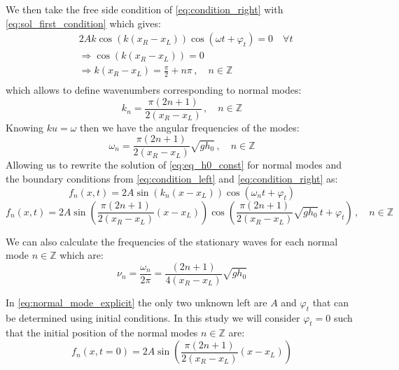 We then take the free side condition of \autoref{eq:condition_right} with \autoref{eq:sol_first_condition} which gives:
\[
    \begin{aligned}
        & 2A k \cos(k(x_R-x_L))\cos(\omega t + \varphi_t) = 0 \quad \forall t \\
        & \Rightarrow \cos(k(x_R-x_L)) = 0 \\
        & \Rightarrow k(x_R-x_L) = \frac{\pi}{2} + n\pi\,, \quad n \in \mathbb{Z} \\
    \end{aligned}
\]
which allows to define wavenumbers corresponding to normal modes:
\begin{equation}
    k_n = \frac{\pi(2n + 1)}{2(x_R-x_L)}\,, \quad n \in \mathbb{Z}
    \label{eq:wavenumber_mode}
\end{equation}
Knowing $ku = \omega$ then we have the angular frequencies of the modes:
\begin{equation}
    \omega_n = \frac{\pi(2n + 1)}{2(x_R-x_L)} \sqrt{gh_0}\,, \quad n \in \mathbb{Z}
    \label{eq:angular_mode}
\end{equation}
Allowing us to rewrite the solution of \autoref{eq:eq_h0_const} for normal modes and the boundary conditions from \autoref{eq:condition_left} and \autoref{eq:condition_right} as:
\begin{equation}
    f_n(x,t) = 2A\sin(k_n(x - x_L))\cos(\omega_n t + \varphi_t)
    \label{eq:normal_mode_simple}
\end{equation}
\begin{equation}
    f_n(x,t) = 2A\sin\left(\frac{\pi(2n + 1)}{2(x_R-x_L)}(x - x_L)\right)\cos\left(\frac{\pi(2n + 1)}{2(x_R-x_L)} \sqrt{gh_0} \, t + \varphi_t\right)\,, \quad n \in \mathbb{Z}
    \label{eq:normal_mode_explicit}
\end{equation}

We can also calculate the frequencies of the stationary waves for each normal mode $n \in \mathbb{Z}$ which are:
\begin{equation}
    \nu_n = \frac{\omega_n}{2\pi} = \frac{(2n + 1)}{4(x_R-x_L)} \sqrt{gh_0}
    \label{eq:normal_frequency}
\end{equation}

In \autoref{eq:normal_mode_explicit} the only two unknown left are $A$ and $\varphi_t$ that can be determined using initial conditions. In this study we will consider $\varphi_t = 0$ such that the initial position of the normal modes $n \in \mathbb{Z}$ are:
\begin{equation}
    f_n(x,t=0) = 2A\sin\left(\frac{\pi(2n + 1)}{2(x_R-x_L)}(x - x_L)\right)
    \label{eq:normal_initial}
\end{equation}


